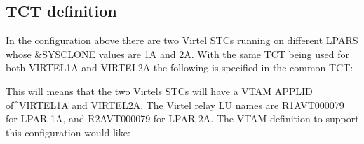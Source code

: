 \documentclass[letterpaper,10pt,english]{sphinxmanual}
\begin{document}
\subsection{TCT definition}
\label{\detokenize{connectivity_guide:tct-definition}}
\sphinxAtStartPar
In the configuration above there are two Virtel STCs running on different LPARS whose \&SYSCLONE values are 1A and 2A. With the same TCT being used for both VIRTEL1A and VIRTEL2A the following is specified in the common TCT:\sphinxhyphen{}

\begin{sphinxVerbatim}[commandchars=\\\{\}]
\end{sphinxVerbatim}

\sphinxAtStartPar
This will means that the two Virtels STCs will have a VTAM APPLID of\textasciicircum{}VIRTEL1A and VIRTEL2A. The Virtel relay LU names are R1AVT000\sphinxhyphen{}079 for LPAR 1A, and R2AVT000\sphinxhyphen{}079 for LPAR 2A.
The VTAM definition to support this configuration would like:\sphinxhyphen{}
\end{document}
